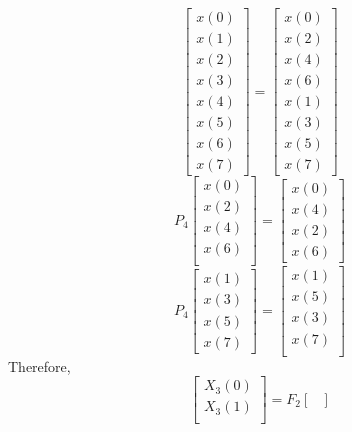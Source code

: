 \documentclass[journal,12pt,twocolumn]{IEEEtran}
\renewcommand\thesection{\arabic{section}}
\begin{document}
\begin{enumerate}[label=\arabic*.,ref=\thesection.\theenumi]
\begin{equation}
\begin{bmatrix}
x(0) \\ 
x(1) \\ 
x(2) \\ 
x(3) \\ 
x(4) \\ 
x(5) \\
x(6) \\
x(7)
\end{bmatrix}
 = 
\begin{bmatrix}
x(0) \\ 
x(2) \\ 
x(4) \\ 
x(6) \\
x(1) \\ 
x(3) \\ 
x(5) \\
x(7)
\end{bmatrix}
\end{equation}
\begin{equation}
P_{4}
\begin{bmatrix}
x(0) \\ 
x(2) \\ 
x(4) \\ 
x(6) \\
\end{bmatrix}
 = 
\begin{bmatrix}
x(0) \\ 
x(4) \\ 
x(2) \\
x(6)
\end{bmatrix}
\end{equation}
\begin{equation}
P_{4}
\begin{bmatrix}
x(1) \\ 
x(3) \\ 
x(5) \\
x(7)
\end{bmatrix}
 = 
\begin{bmatrix}
x(1) \\ 
x(5) \\ 
x(3) \\ 
x(7) \\
\end{bmatrix}
\end{equation}
Therefore,
\begin{equation}
\begin{bmatrix}
X_{3}(0) \\ 
X_{3}(1)\\ 
\end{bmatrix}
= F_{2}
\begin{bmatrix}

\end{bmatrix}
\end{equation}
\end{enumerate}
\end{document}

